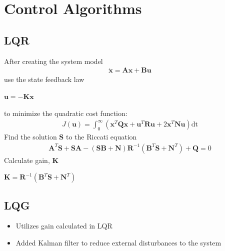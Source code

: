 \chapter{Control Algorithms}
\label{ch: Chapter3}

\section{LQR}

    After creating the system model
    \begin{align*}
        \dot{\mathbf{x}} = \mathbf{A}\mathbf{x} + \mathbf{B}\mathbf{u}
    \end{align*}
    use the state feedback law
    \begin{center}
        $\mathbf{u} = -\mathbf{K}\mathbf{x}$
    \end{center}
    to minimize the quadratic cost function:
    \begin{align*}
        J(\mathbf{u}) = \int_0^\infty (\mathbf{x}^T\mathbf{Q}\mathbf{x} + \mathbf{u}^T\mathbf{R}\mathbf{u} + 2\mathbf{x}^T\mathbf{N}\mathbf{u})\mathrm{dt}
    \end{align*}
    Find the solution $\mathbf{S}$ to the Riccati equation
    \begin{align*}
        \mathbf{A}^T\mathbf{S}+\mathbf{SA}-(\mathbf{SB}+\mathbf{N})\mathbf{R}^{-1}(\mathbf{B}^T\mathbf{S}+\mathbf{N}^T)+\mathbf{Q}=0
    \end{align*}    
    Calculate gain, $\mathbf{K}$
    \begin{center}
        $\mathbf{K}=\mathbf{R}^{-1}(\mathbf{B}^T\mathbf{S}+\mathbf{N}^T)$
    \end{center}

\section{LQG}

\begin{itemize}   
    \item Utilizes gain calculated in LQR
    \item Added Kalman filter to reduce external disturbances to the system
\end{itemize}
